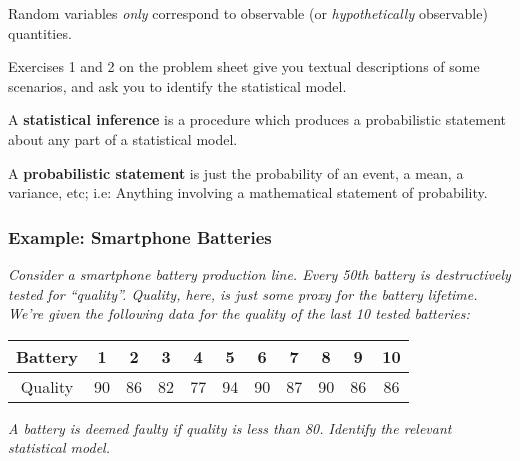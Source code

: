\documentclass[a4paper]{article}
\begin{document}
            \begin{warn}
                Random variables \textit{only} correspond to observable (or
                \textit{hypothetically} observable) quantities.
            \end{warn}

            \begin{relq}
                Exercises 1 and 2 on the problem sheet give you textual
                descriptions of some scenarios, and ask you to identify the
                statistical model.
            \end{relq}

            \begin{definition}
                A \textbf{statistical inference} is a procedure which produces
                a probabilistic statement about any part of a
                statistical model.

                A \textbf{probabilistic statement} is just the probability of an
                event, a mean, a variance, etc; i.e: Anything involving a
                mathematical statement of probability.
            \end{definition}

            \subsubsection{Example: Smartphone Batteries}
                \textit{Consider a smartphone battery production line. Every
                50th battery is destructively tested for ``quality''. Quality,
                here, is just some proxy for the battery lifetime. We're given
                the following data for the quality of the last 10 tested
                batteries:}

                \begin{center}
                    \begin{tabular}{c | c c c c c c c c c c}
                        Battery & 1 & 2 & 3 & 4 & 5 & 6 & 7 & 8 & 9 & 10 \\
                        \hline
                        Quality & 90 & 86 & 82 & 77 & 94 & 90 & 87 & 90 & 86 &
                            86
                    \end{tabular}
                \end{center}

                \textit{A battery is deemed faulty if quality is less than 80.
                Identify the relevant statistical model.}
\end{document}
